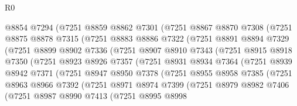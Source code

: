 \begin{lexlean}{R0}
\begin{coremodule}
            @8854
            @7294
            (@7251
              @8859
              @8862
              @7301
              (@7251
                @8867
                @8870
                @7308
                (@7251
                  @8875
                  @8878
                  @7315
                  (@7251
                    @8883
                    @8886
                    @7322
                    (@7251
                      @8891
                      @8894
                      @7329
                      (@7251
                        @8899
                        @8902
                        @7336
                        (@7251
                          @8907
                          @8910
                          @7343
                          (@7251
                            @8915
                            @8918
                            @7350
                            (@7251
                              @8923
                              @8926
                              @7357
                              (@7251
                                @8931
                                @8934
                                @7364
                                (@7251
                                  @8939
                                  @8942
                                  @7371
                                  (@7251
                                    @8947
                                    @8950
                                    @7378
                                    (@7251
                                      @8955
                                      @8958
                                      @7385
                                      (@7251
                                        @8963
                                        @8966
                                        @7392
                                        (@7251
                                          @8971
                                          @8974
                                          @7399
                                          (@7251
                                            @8979
                                            @8982
                                            @7406
                                            (@7251
                                              @8987
                                              @8990
                                              @7413
                                              (@7251
                                                @8995
                                                @8998

\end{coremodule}
\end{lexlean}

